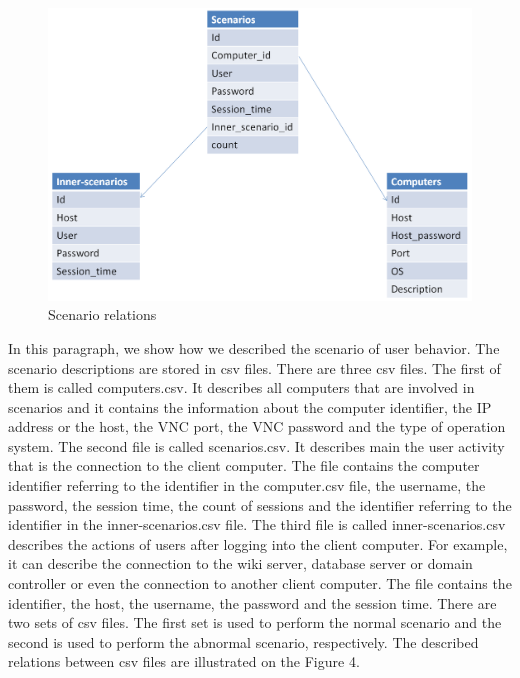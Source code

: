 \begin{figure}[ht!]
\centering
\includegraphics[width=\textwidth]{scenario_relations.png}
\caption{Scenario relations}
\label{overflow}
\end{figure}



In this paragraph, we show how we described the scenario of user behavior. The scenario descriptions are stored in csv files. There are three csv files. The first of them is called computers.csv. It describes all computers that are involved in scenarios and it contains the information about the computer identifier, the IP address or the host, the VNC port, the VNC password and the type of operation system.
The second file is called scenarios.csv. It describes main the user activity that is the connection to the client computer. The file contains the computer identifier referring to the identifier in the computer.csv file, the username, the password, the session time, the count of sessions and the identifier referring to the identifier in the inner-scenarios.csv file. The third file is called inner-scenarios.csv describes the actions of users after logging into the client computer. For example, it can describe the connection to the wiki server, database server or domain controller or even the connection to another client computer. The file contains the identifier, the host, the username, the password and the session time. There are two sets of csv files. The first set is used to perform the normal scenario and the second is used to perform the abnormal scenario, respectively. The described relations between csv files are illustrated on the Figure 4.
 	
